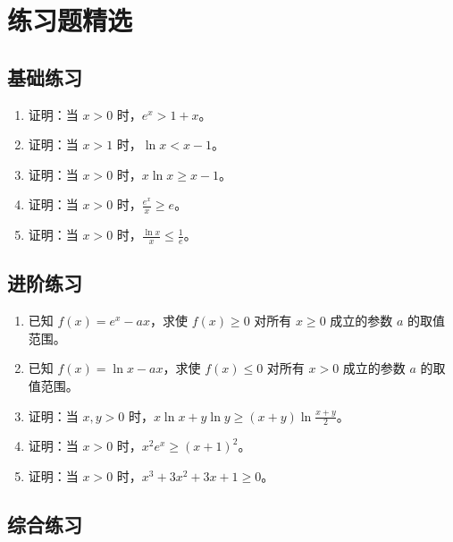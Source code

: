 \documentclass[a4paper,11pt]{ctexrep}
\theoremstyle{definition}
\begin{document}
\section{练习题精选}

\subsection{基础练习}

\begin{enumerate}
    \item 证明：当 $x > 0$ 时，$e^x > 1 + x$。
    \item 证明：当 $x > 1$ 时，$\ln x < x - 1$。
    \item 证明：当 $x > 0$ 时，$x\ln x \geq x - 1$。
    \item 证明：当 $x > 0$ 时，$\frac{e^x}{x} \geq e$。
    \item 证明：当 $x > 0$ 时，$\frac{\ln x}{x} \leq \frac{1}{e}$。
\end{enumerate}

\subsection{进阶练习}

\begin{enumerate}
    \item 已知 $f(x) = e^x - ax$，求使 $f(x) \geq 0$ 对所有 $x \geq 0$ 成立的参数 $a$ 的取值范围。
    \item 已知 $f(x) = \ln x - ax$，求使 $f(x) \leq 0$ 对所有 $x > 0$ 成立的参数 $a$ 的取值范围。
    \item 证明：当 $x, y > 0$ 时，$x\ln x + y\ln y \geq (x+y)\ln\frac{x+y}{2}$。
    \item 证明：当 $x > 0$ 时，$x^2e^x \geq (x+1)^2$。
    \item 证明：当 $x > 0$ 时，$x^3 + 3x^2 + 3x + 1 \geq 0$。
\end{enumerate}

\subsection{综合练习}
\end{document}

